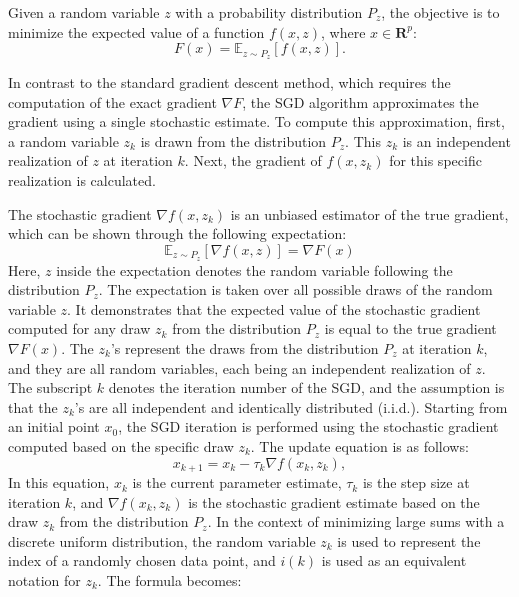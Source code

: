 Given a random variable $z$ with a probability distribution $P_z$, the objective is to minimize the expected value of a function $f(x, z)$, where $x \in \mathbf{R}^p$:
\begin{equation*}\tag{4.4.1}
F(x) = \mathbb{E}_{z \sim P_z}[f(x, z)].
\end{equation*}

In contrast to the standard gradient descent method, which requires the computation of the exact gradient $\nabla F$, the SGD algorithm approximates the gradient using a single stochastic estimate. To compute this approximation, first, a random variable $z_k$ is drawn from the distribution $P_z$. This $z_k$ is an independent realization of $z$ at iteration $k$. Next, the gradient of $f(x, z_k)$ for this specific realization is calculated.

The stochastic gradient $\nabla f(x, z_k)$ is an unbiased estimator of the true gradient, which can be shown through the following expectation:
\begin{equation*}\label{gd_unbiased}\tag{4.4.2}
\mathbb{E}_{z \sim P_z}[\nabla f(x, z)] = \nabla F(x)
\end{equation*}
Here, $z$ inside the expectation denotes the random variable following the distribution $P_z$. The expectation is taken over all possible draws of the random variable $z$. It demonstrates that the expected value of the stochastic gradient computed for any draw $z_k$ from the distribution $P_z$ is equal to the true gradient $\nabla F(x)$. The $z_k$'s represent the draws from the distribution $P_z$ at iteration $k$, and they are all random variables, each being an independent realization of $z$. The subscript $k$ denotes the iteration number of the SGD, and the assumption is that the $z_k$'s are all independent and identically distributed (i.i.d.). Starting from an initial point $x_0$, the SGD iteration is performed using the stochastic gradient computed based on the specific draw $z_k$. The update equation is as follows:
\begin{equation*}\tag{4.4.3}
x_{k+1} = x_k - \tau_k \nabla f(x_k, z_k),
\end{equation*}
In this equation, $x_k$ is the current parameter estimate, $\tau_k$ is the step size at iteration $k$, and $\nabla f(x_k, z_k)$ is the stochastic gradient estimate based on the draw $z_k$ from the distribution $P_z$.  In the context of minimizing large sums with a discrete uniform distribution, the random variable $z_k$ is used to represent the index of a randomly chosen data point, and $i(k)$ is used as an equivalent notation for $z_k$. The formula becomes:
